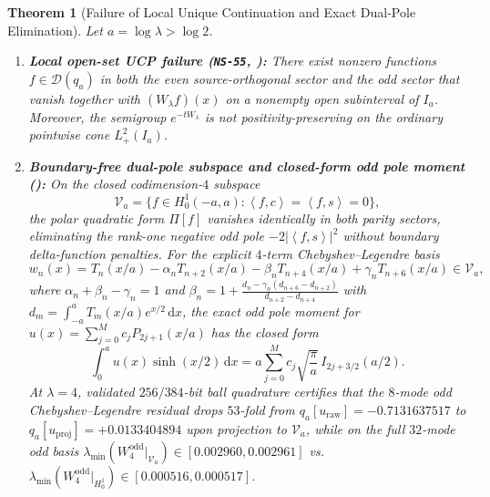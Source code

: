 \documentclass[11pt]{article}
\newtheorem{theorem}{Theorem}[section]
\theoremstyle{remark}
\newcommand{\ip}[2]{\left\langle #1,#2\right\rangle}
\newcommand{\dd}{\mathrm d}
\begin{document}
\begin{theorem}[Failure of Local Unique Continuation and Exact Dual-Pole Elimination]
\label{thm:ucp-and-dual-pole}
Let $a = \log\lambda > \log 2$.
\begin{enumerate}[label=(\alph*)]
  \item \textbf{Local open-set UCP failure (\texttt{NS-55}, ):} There exist nonzero functions $f \in \mathcal{D}(q_a)$ in both the even source-orthogonal sector and the odd sector that vanish together with $(W_\lambda f)(x)$ on a nonempty open subinterval of $I_a$. Moreover, the semigroup $e^{-t W_\lambda}$ is not positivity-preserving on the ordinary pointwise cone $L^2_+(I_a)$.
  \item \textbf{Boundary-free dual-pole subspace and closed-form odd pole moment ():} On the closed codimension-$4$ subspace
  \begin{equation}
    \mathcal{V}_a = \bigl\{f \in H^1_0(-a,a) : \ip{f}{c} = \ip{f}{s} = 0\bigr\},
  \end{equation}
  the polar quadratic form $\Pi[f]$ vanishes identically in both parity sectors, eliminating the rank-one negative odd pole $-2|\ip{f}{s}|^2$ without boundary delta-function penalties. For the explicit $4$-term Chebyshev--Legendre basis
  \begin{equation}
    w_n(x) = T_n(x/a) - \alpha_n T_{n+2}(x/a) - \beta_n T_{n+4}(x/a) + \gamma_n T_{n+6}(x/a) \in \mathcal{V}_a,
  \end{equation}
  where $\alpha_n + \beta_n - \gamma_n = 1$ and $\beta_n = 1 + \frac{d_n - \gamma_n(d_{n+6} - d_{n+2})}{d_{n+2} - d_{n+4}}$ with $d_m = \int_{-a}^a T_m(x/a)e^{x/2}\,\dd x$, the exact odd pole moment for $u(x) = \sum_{j=0}^M c_j P_{2j+1}(x/a)$ has the closed form
  \begin{equation}
    \int_0^a u(x)\sinh(x/2)\,\dd x = a \sum_{j=0}^M c_j \sqrt{\frac{\pi}{a}}\, I_{2j+3/2}(a/2).
  \end{equation}
  At $\lambda = 4$, validated $256/384$-bit ball quadrature certifies that the $8$-mode odd Chebyshev--Legendre residual drops $53$-fold from $q_a[u_{\mathrm{raw}}] = -0.7131637517$ to $q_a[u_{\mathrm{proj}}] = +0.0133404894$ upon projection to $\mathcal{V}_a$, while on the full $32$-mode odd basis $\lambda_{\min}(W_4^{\mathrm{odd}}\big|_{\mathcal{V}_a}) \in [0.002960, 0.002961]$ vs.\ $\lambda_{\min}(W_4^{\mathrm{odd}}\big|_{H^1_0}) \in [0.000516, 0.000517]$.
\end{enumerate}
\end{theorem}
\end{document}
